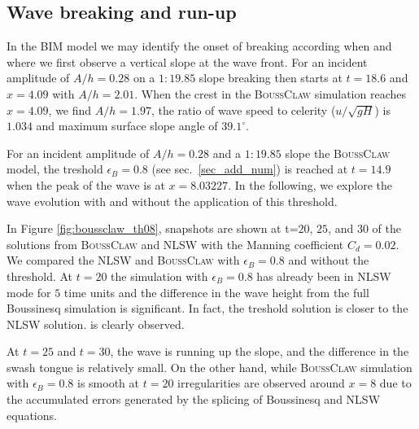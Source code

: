 \documentclass[review]{elsarticle}
\newcommand{\BoussClaw}{\textsc{BoussClaw} }
\begin{document}
\subsection{Wave breaking and run-up}
In the BIM model we may identify the onset of breaking according when and where we first observe a vertical slope at the wave front.
For an incident amplitude of $A/h=0.28$ on a $1:19.85$ slope
breaking then starts at $t=18.6$ and $x=4.09$ with $A/h=2.01$.
When the crest in the \BoussClaw simulation reaches $x=4.09$, 
we find
$A/h=1.97$, the ratio of wave speed to celerity ($u/\sqrt{gH}$)
is $1.034$ and maximum surface slope angle of $39.1^\circ$.

For an incident amplitude of $A/h=0.28$ and a $1:19.85$ slope the \BoussClaw model,
the treshold $\epsilon_B=0.8$ (see sec.~\ref{sec_add_num}) is  reached at $t=14.9$
when the peak of the wave is at $x=8.03227$.
In the following, we explore the wave evolution with and without
the application of this threshold.

In Figure \ref{fig:boussclaw_th08}, snapshots are shown at 
t=$20$, $25$, and $30$ of the solutions from \BoussClaw and NLSW
with the Manning coefficient $C_d=0.02$.
We compared the NLSW and \BoussClaw with $\epsilon_B=0.8$
and without the threshold. 
At $t=20$ the simulation with $\epsilon_B=0.8$ has already been in NLSW mode for $5$ time units and the difference in the wave height 
from the full Boussinesq simulation is significant. In fact, the treshold solution is closer to the NLSW solution.
is clearly observed. 

At $t=25$ and $t=30$, the wave is running up the slope, 
and the difference in the swash tongue is relatively small. 
On the other hand, while \BoussClaw simulation with $\epsilon_B=0.8$ is
smooth at $t=20$ irregularities are observed
around $x=8$ due to the accumulated errors generated by the splicing of 
Boussinesq and NLSW equations. 
\end{document}
